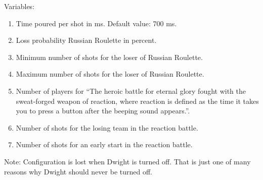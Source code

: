 Variables:
\begin{enumerate}
  \item Time poured per shot in ms. Default value: 700 ms.
  \item Loss probability Russian Roulette in percent.
  \item Minimum number of shots for the loser of Russian Roulette.
  \item Maximum number of shots for the loser of Russian Roulette.
  \item Number of players for ``The heroic battle for eternal glory fought with the sweat-forged weapon of reaction, where reaction is defined as the time it takes you to press a button after the beeping sound appears.''.
  \item Number of shots for the losing team in the reaction battle.
  \item Number of shots for an early start in the reaction battle.
\end{enumerate}

Note: Configuration is lost when Dwight is turned off. That is just one of many reasons why Dwight should never be turned off.

